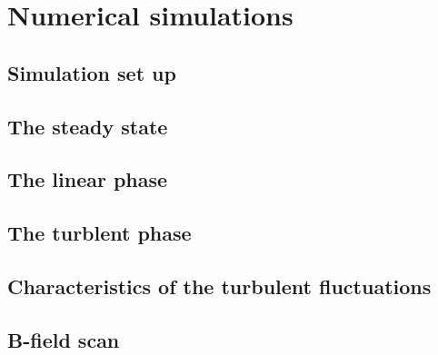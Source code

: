 \documentclass[12pt,a4paper,oneside,openright]{report} %
\begin{document}
% 
% 
% 
% 
% 
% 
% 
% 
% 
% 
% 
%
\part{Numerical simulations}
\label{part:results}
\chapter{Simulation set up}
\label{chap:setup}

\chapter{The steady state}
\label{chap:ss}

\chapter{The linear phase}
\label{chap:linear}

\chapter{The turblent phase}
\label{chap:satTurb}

\chapter{Characteristics of the turbulent fluctuations}
\label{chap:charTurb}




\chapter{B-field scan}
\label{chap:BFScan}

\end{document}
